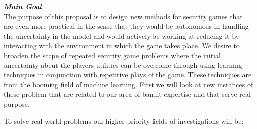 

\noindent \textit{\textbf{Main Goal}}\\ The purpose of this proposal is to design new methods for security games that are even more practical  in the sense that they would be autonomous in handling the uncertainty in the model and would actively be working at reducing it by interacting with the environment in which the game takes place. We desire to broaden the scope of repeated security game problems where the initial uncertainty about the players utilities can be overcome through using learning techniques  in conjunction with  repetitive plays of the game. These techniques are from the booming field of machine learning.
First we will look at new instances of these problem that are related to our area of bandit expertise and that serve real purpose.

To solve real world problems our higher priority fields of investigations will be:

